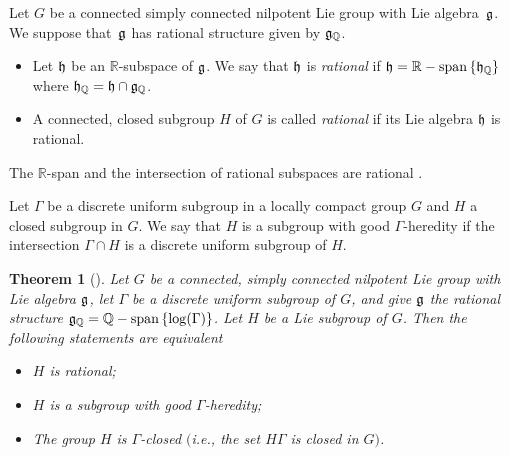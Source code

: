 \documentclass[11pt]{article}
\newtheorem{theorem}{Theorem}
\providecommand{\mathds}[1]{\mathbb{#1}}
\newcommand{\set}[1]{\left\{#1\right\}}
\DeclareMathOperator{\spann}{\mathds{R}-span}
\DeclareMathOperator{\spannq}{\mathds{Q}-span}
\def\dsr{{\mathds R}}
\def\dsq{{\mathds Q}}
\begin{document}
\begin{definition} Let $G$ be a connected
simply connected nilpotent Lie group with Lie algebra~$\frak g$. We
suppose that~$\frak g$ has rational structure given by $\frak
g_\dsq$.
\begin{itemize}\itemsep=0pt
  \item[$(1)$]
Let  $\frak h$ be an $\mathds{R}$-subspace of $\frak g$.  We say
that $\frak h$ is \textit{rational} if $\frak h = \spann\set{\frak
h_\mathds{Q}}$ where  $\frak h_\mathds{Q}= \frak h \cap \frak
g_\mathds{Q}$.
\item[$(2)$]
 A connected, closed subgroup
$H$ of $G$ is called \textit{rational} if its Lie algebra $\frak h$
is rational.
\end{itemize}
\end{definition}


\begin{remark}\label{ratio-intersection}
The $\dsr$-span and the intersection of rational subspaces are
rational \cite[Lemma 5.1.2]{Cor1}.
\end{remark}

\begin{definition} Let $\Gamma$ be a discrete uniform subgroup in a
locally compact group $G$ and $H$ a closed subgroup in $G$. We say
that $H$ is a subgroup with good $\Gamma$-heredity if the
intersection $\Gamma\cap H$ is a discrete uniform subgroup of $H$.
\end{definition}



\begin{theorem}[] Let $G$ be a connected, simply connected
nilpotent Lie group with Lie algebra  $\frak g$,  let $\Gamma$ be a
discrete uniform subgroup of $G$, and give $\frak g$ the rational
structure $\frak g_\dsq = \spannq\set{\log(\Gamma)}$.  Let $H$ be a
Lie subgroup of $G$. Then  the following statements are equivalent
\begin{itemize}\itemsep=0pt
  \item[$(1)$] $H$ is rational;
  \item[$(2)$] $H$ is a subgroup with good $\Gamma$-heredity;
  \item[$(3)$] The group $H$ is $\Gamma$-closed $($i.e., the set
  $H\Gamma$ is closed in $G)$.
\end{itemize}
\end{theorem}
\end{document}
